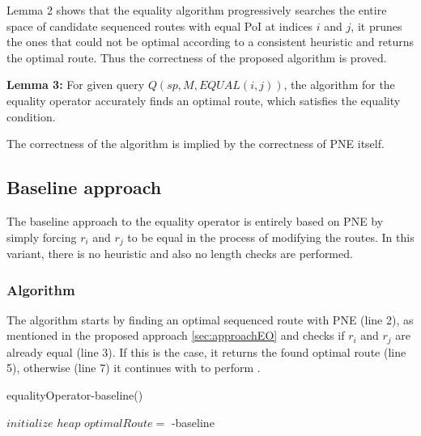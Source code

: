 Lemma 2 shows that the equality algorithm progressively searches the entire space of candidate sequenced routes with equal PoI at indices $i$ and $j$, it prunes the ones that could not be optimal according to a consistent heuristic and returns the optimal route. Thus the correctness of the proposed algorithm is proved.

\textbf{Lemma 3:} For given query $Q(sp, M, EQUAL(i, j))$, the algorithm for the equality operator accurately finds an optimal route, which satisfies the equality condition.

The correctness of the algorithm is implied by the correctness of PNE itself.

\subsection{Baseline approach} 
\label{sec:baselineEO}
The baseline approach to the equality operator is entirely based on PNE by simply forcing $r_i$ and $r_j$ to be equal in the process of modifying the routes. In this variant, there is no heuristic and also no length checks are performed.

\subsubsection{Algorithm}
The algorithm \texttt{} starts by finding an optimal sequenced route with PNE (line 2), as mentioned in the proposed approach \ref{sec:approachEO} and checks if $r_i$ and $r_j$ are already equal (line 3). If this is the case, it returns the found optimal route (line 5), otherwise (line 7) it continues with to perform \texttt{}. 

\pagebreak

\begin{algorithm}[H]
\caption{equalityOperator-baseline()}
\label{alg:equality_baseline}
	
	
	
	\BlankLine
	
	$initialize$ $heap$ 
	$optimalRoute =$\;
	{
		\modifiedPNE-baseline{}\;
	}
\end{algorithm}

